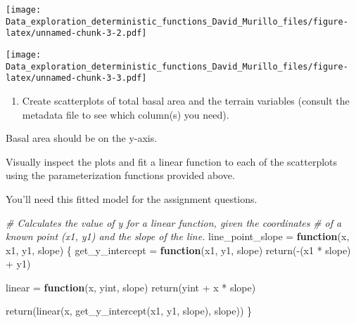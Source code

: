 \documentclass[
]{article}
\newenvironment{Shaded}{\begin{snugshade}}{\end{snugshade}}
\newcommand{\AttributeTok}[1]{\textcolor[rgb]{0.77,0.63,0.00}{#1}}
\newcommand{\CommentTok}[1]{\textcolor[rgb]{0.56,0.35,0.01}{\textit{#1}}}
\newcommand{\ControlFlowTok}[1]{\textcolor[rgb]{0.13,0.29,0.53}{\textbf{#1}}}
\newcommand{\FunctionTok}[1]{\textcolor[rgb]{0.00,0.00,0.00}{#1}}
\newcommand{\NormalTok}[1]{#1}
\newcommand{\OtherTok}[1]{\textcolor[rgb]{0.56,0.35,0.01}{#1}}
\newcommand{\SpecialCharTok}[1]{\textcolor[rgb]{0.00,0.00,0.00}{#1}}
\newcommand{\StringTok}[1]{\textcolor[rgb]{0.31,0.60,0.02}{#1}}
\providecommand{\tightlist}{%
  \setlength{\itemsep}{0pt}\setlength{\parskip}{0pt}}
\begin{document}
\texttt{[image: Data\_exploration\_deterministic\_functions\_David\_Murillo\_files/figure-latex/unnamed-chunk-3-2.pdf]}

\begin{Shaded}
\end{Shaded}

\texttt{[image: Data\_exploration\_deterministic\_functions\_David\_Murillo\_files/figure-latex/unnamed-chunk-3-3.pdf]}

\begin{enumerate}
\def\labelenumi{\arabic{enumi}.}
\tightlist
\item
  Create scatterplots of total basal area and the terrain variables
  (consult the metadata file to see which column(s) you need).
\end{enumerate}

Basal area should be on the y-axis.

Visually inspect the plots and fit a linear function to each of the
scatterplots using the parameterization functions provided above.

You'll need this fitted model for the assignment questions.

\begin{Shaded}
\begin{Highlighting}[]
\CommentTok{\# Calculates the value of y for a linear function, given the coordinates}
\CommentTok{\# of a known point (x1, y1) and the slope of the line.}
\NormalTok{line\_point\_slope }\OtherTok{=} \ControlFlowTok{function}\NormalTok{(x, x1, y1, slope)}
\NormalTok{\{}
\NormalTok{  get\_y\_intercept }\OtherTok{=} 
    \ControlFlowTok{function}\NormalTok{(x1, y1, slope) }
      \FunctionTok{return}\NormalTok{(}\SpecialCharTok{{-}}\NormalTok{(x1 }\SpecialCharTok{*}\NormalTok{ slope) }\SpecialCharTok{+}\NormalTok{ y1)}
  
\NormalTok{  linear }\OtherTok{=} 
    \ControlFlowTok{function}\NormalTok{(x, yint, slope) }
      \FunctionTok{return}\NormalTok{(yint }\SpecialCharTok{+}\NormalTok{ x }\SpecialCharTok{*}\NormalTok{ slope)}
  
  \FunctionTok{return}\NormalTok{(}\FunctionTok{linear}\NormalTok{(x, }\FunctionTok{get\_y\_intercept}\NormalTok{(x1, y1, slope), slope))}
\NormalTok{\}}
\end{Highlighting}
\end{Shaded}
\end{document}
